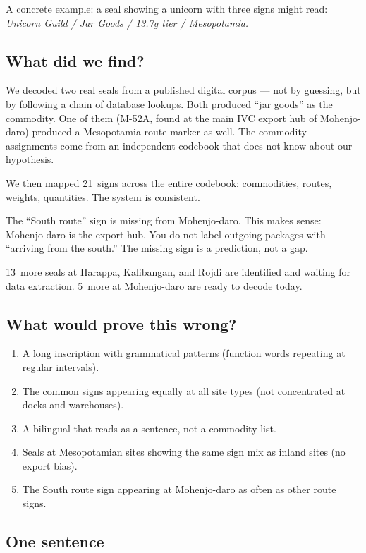 A concrete example: a seal showing a unicorn with three signs might
read: \textit{Unicorn Guild / Jar Goods / 13.7g tier /
Mesopotamia.}

\subsection{What did we find?}

We decoded two real seals from a published digital corpus ---
not by guessing, but by following a chain of database lookups.
Both produced ``jar goods'' as the commodity.
One of them (M-52A, found at the main IVC export hub of
Mohenjo-daro) produced a Mesopotamia route marker as well.
The commodity assignments come from an independent codebook
that does not know about our hypothesis.

We then mapped 21~signs across the entire codebook: commodities,
routes, weights, quantities. The system is consistent.

The ``South route'' sign is missing from Mohenjo-daro. This makes
sense: Mohenjo-daro is the export hub. You do not label outgoing
packages with ``arriving from the south.'' The missing sign is a
prediction, not a gap.

13~more seals at Harappa, Kalibangan, and Rojdi are identified
and waiting for data extraction. 5~more at Mohenjo-daro are ready
to decode today.

\subsection{What would prove this wrong?}

\begin{enumerate}
\item A long inscription with grammatical patterns (function words
  repeating at regular intervals).
\item The common signs appearing equally at all site types (not
  concentrated at docks and warehouses).
\item A bilingual that reads as a sentence, not a commodity list.
\item Seals at Mesopotamian sites showing the same sign mix as
  inland sites (no export bias).
\item The South route sign appearing at Mohenjo-daro as often as
  other route signs.
\end{enumerate}

\subsection{One sentence}

